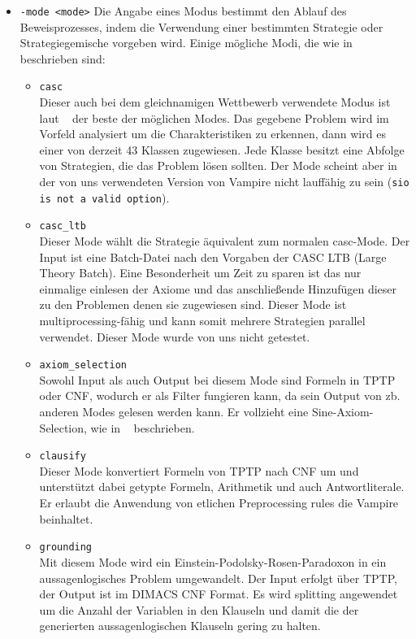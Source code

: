 \documentclass{article}
\begin{document}
\begin{itemize}
\item \verb|-mode <mode>| \label{arg:modes}
Die Angabe eines Modus bestimmt den Ablauf des Beweisprozesses, 
indem die Verwendung einer bestimmten Strategie oder Strategiegemische vorgeben wird.
Einige mögliche Modi, die wie in ~\cite{hoder2011slides} beschrieben sind:
\begin{itemize}
	\item \verb|casc| \\
	Dieser auch bei dem gleichnamigen Wettbewerb verwendete Modus ist laut ~\cite{hoder2011slides} der beste der möglichen Modes.
	Das gegebene Problem wird im Vorfeld analysiert um die Charakteristiken zu erkennen, dann wird es einer von derzeit 43 Klassen zugewiesen. Jede Klasse besitzt eine Abfolge von Strategien, die das Problem lösen sollten.
	Der Mode scheint aber in der von uns verwendeten Version von Vampire nicht lauffähig zu sein (\texttt{sio is not a valid option}).
	\item \verb|casc_ltb| \\
	Dieser Mode wählt die Strategie äquivalent zum normalen casc-Mode. Der Input ist eine Batch-Datei nach den Vorgaben der CASC LTB (Large Theory Batch). Eine Besonderheit um Zeit zu sparen ist das nur einmalige einlesen der Axiome und das anschließende Hinzufügen dieser zu den Problemen denen sie zugewiesen sind. Dieser Mode ist multiprocessing-fähig und kann somit mehrere Strategien parallel verwendet. Dieser Mode wurde von uns nicht getestet.
	\item \verb|axiom_selection| \\
	Sowohl Input als auch Output bei diesem Mode sind Formeln in TPTP oder CNF, wodurch er als Filter fungieren kann, da sein Output von zb. anderen Modes gelesen werden kann.
	Er vollzieht eine Sine-Axiom-Selection, wie in ~\cite{sinquanon} beschrieben.
	\item \verb|clausify| \\
	Dieser Mode konvertiert Formeln von TPTP nach CNF um und unterstützt dabei getypte Formeln, Arithmetik und auch Antwortliterale. Er erlaubt die Anwendung von etlichen Preprocessing rules die Vampire beinhaltet.
	\item \verb|grounding| \\
	Mit diesem Mode wird ein Einstein-Podolsky-Rosen-Paradoxon in ein aussagenlogisches Problem umgewandelt. Der Input erfolgt über TPTP, der Output ist im DIMACS CNF Format.
	Es wird splitting angewendet um die Anzahl der Variablen in den Klauseln und damit die der generierten aussagenlogischen Klauseln gering zu halten.

\end{itemize}
\end{itemize}
\end{document}
